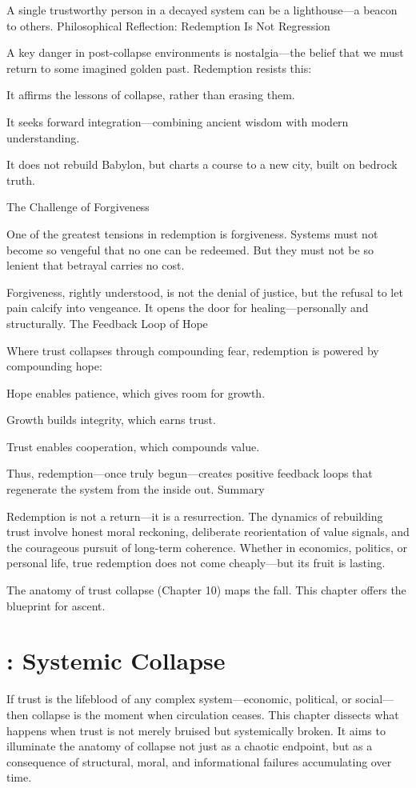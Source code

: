 \documentclass[11pt,oneside]{book}
\begin{document}
A single trustworthy person in a decayed system can be a lighthouse—a beacon to others.
Philosophical Reflection: Redemption Is Not Regression

A key danger in post-collapse environments is nostalgia—the belief that we must return to some imagined golden past. Redemption resists this:

    It affirms the lessons of collapse, rather than erasing them.

    It seeks forward integration—combining ancient wisdom with modern understanding.

    It does not rebuild Babylon, but charts a course to a new city, built on bedrock truth.

The Challenge of Forgiveness

One of the greatest tensions in redemption is forgiveness. Systems must not become so vengeful that no one can be redeemed. But they must not be so lenient that betrayal carries no cost.

Forgiveness, rightly understood, is not the denial of justice, but the refusal to let pain calcify into vengeance. It opens the door for healing—personally and structurally.
The Feedback Loop of Hope

Where trust collapses through compounding fear, redemption is powered by compounding hope:

    Hope enables patience, which gives room for growth.

    Growth builds integrity, which earns trust.

    Trust enables cooperation, which compounds value.

Thus, redemption—once truly begun—creates positive feedback loops that regenerate the system from the inside out.
Summary

Redemption is not a return—it is a resurrection. The dynamics of rebuilding trust involve honest moral reckoning, deliberate reorientation of value signals, and the courageous pursuit of long-term coherence. Whether in economics, politics, or personal life, true redemption does not come cheaply—but its fruit is lasting.

The anatomy of trust collapse (Chapter 10) maps the fall. This chapter offers the blueprint for ascent.


\chapter{: Systemic Collapse}

If trust is the lifeblood of any complex system—economic, political, or social—then collapse is the moment when circulation ceases. This chapter dissects what happens when trust is not merely bruised but systemically broken. It aims to illuminate the anatomy of collapse not just as a chaotic endpoint, but as a consequence of structural, moral, and informational failures accumulating over time.
\end{document}
